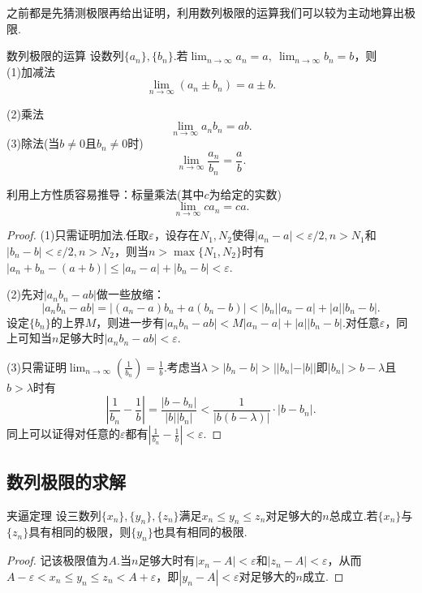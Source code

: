 \documentclass[lang=cn, zihao=5]{elegantbook}
\begin{document}
之前都是先猜测极限再给出证明，利用数列极限的运算我们可以较为主动地算出极限.

\begin{theorem}{数列极限的运算}
	设数列$\{ a_n \},\{ b_n \}$.若$\lim_{n \to \infty} a_n=a,~\lim_{n \to \infty} b_n=b$，则 \\
	(1)加减法$$\lim_{n \to \infty}{(a_n \pm b_n)} = a \pm b.$$

	(2)乘法$$\lim_{n \to \infty}{a_nb_n} = ab.$$
	(3)除法(当$b \neq 0$且$b_n \neq 0$时)$$\lim_{n \to \infty}{\frac{a_n}{b_n}} = \frac{a}{b}.$$
\end{theorem}
\begin{remark}
	利用上方性质容易推导：标量乘法(其中$c$为给定的实数)$$\lim_{n \to \infty}{ca_n}=ca.$$
	
\end{remark}
\begin{proof}
	(1)只需证明加法.任取$\varepsilon$，设存在$N_1,N_2$使得$|a_n-a|<\varepsilon /2,n>N_1$和$|b_n-b|<\varepsilon /2,n>N_2$，则当$n>\max \{ N_1,N_2 \}$时有$|a_n+b_n-(a+b)| \leq |a_n-a|+|b_n-b| < \varepsilon$.
	
	(2)先对$|a_nb_n-ab|$做一些放缩：$$|a_nb_n-ab| = |(a_n-a)b_n + a(b_n-b)| < |b_n||a_n-a| + |a||b_n-b|.$$
	设定$\{ b_n \}$的上界$M$，则进一步有$|a_nb_n-ab|<M|a_n-a| + |a||b_n-b|$.对任意$\varepsilon$，同上可知当$n$足够大时$|a_nb_n-ab|<\varepsilon$.
	
	(3)只需证明$\lim_{n\to \infty}(\frac{1}{b_n})=\frac{1}{b}$.考虑当$\lambda > |b_n-b| > ||b_n|-|b||$即$|b_n|>b-\lambda$且$b>\lambda$时有$$\left| \frac{1}{b_n} - \frac{1}{b} \right| = \frac{|b-b_n|}{|b||b_n|} < \frac{1}{|b(b-\lambda)|} \cdot |b-b_n|.$$
	同上可以证得对任意的$\varepsilon$都有$|\frac{1}{b_n}-\frac{1}{b} |<\varepsilon$.
\end{proof}

\subsection{数列极限的求解}

\begin{theorem}{夹逼定理}
	设三数列$\{ x_n \},\{ y_n \},\{ z_n \}$满足$x_n \leq y_n \leq z_n$对足够大的$n$总成立.若$\{ x_n \}$与$\{ z_n \}$具有相同的极限，则$\{ y_n \}$也具有相同的极限.
\end{theorem}
\begin{proof}
	记该极限值为$A$.当$n$足够大时有$|x_n-A|<\varepsilon$和$|z_n-A|<\varepsilon$，从而$A-\varepsilon < x_n \leq y_n \leq z_n < A+\varepsilon$，即$|y_n-A|<\varepsilon$对足够大的$n$成立.
\end{proof}
\end{document}
